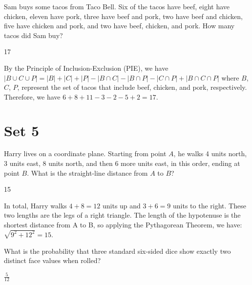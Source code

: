 \documentclass[11pt]{article}
\begin{document}
\begin{problem} %
Sam buys some tacos from Taco Bell. Six of the tacos have beef, eight have chicken, eleven have pork, three have beef and pork, two have beef and chicken, five have chicken and pork, and two have beef, chicken, and pork. How many tacos did Sam buy?
\end{problem}

\begin{answer}
17
\end{answer}

\begin{solution} %
By the Principle of Inclusion-Exclusion (PIE), we have $|B \cup C \cup P| = |B| + |C| + |P| - |B \cap C| - |B \cap P| - | C \cap P| + |B \cap C \cap P|$ where $B$, $C$, $P$, represent the set of tacos that include beef, chicken, and pork, respectively. Therefore, we have $6+8+11-3-2-5+2=17$.
\end{solution}

\newpage

\section*{Set 5}

\begin{problem} %
Harry lives on a coordinate plane. Starting from point $A$, he walks 4 units north, 3 units east, 8 units north, and then 6 more units east, in this order, ending at point $B$. What is the straight-line distance from $A$ to $B$?
\end{problem}

\begin{answer}
15
\end{answer}

\begin{solution} %
In total, Harry walks $4+8 = 12$ units up and $3+6=9$ units to the right. These two lengths are the legs of a right triangle. The length of the hypotenuse is the shortest distance from A to B, so applying the Pythagorean Theorem, we have: $\sqrt{9^2+12^2} = 15$.
\end{solution}

\begin{problem}%
What is the probability that three standard six-sided dice  show exactly two distinct face values when rolled?
\end{problem}

\begin{answer}
$\frac{5}{12}$
\end{answer}
\end{document}
